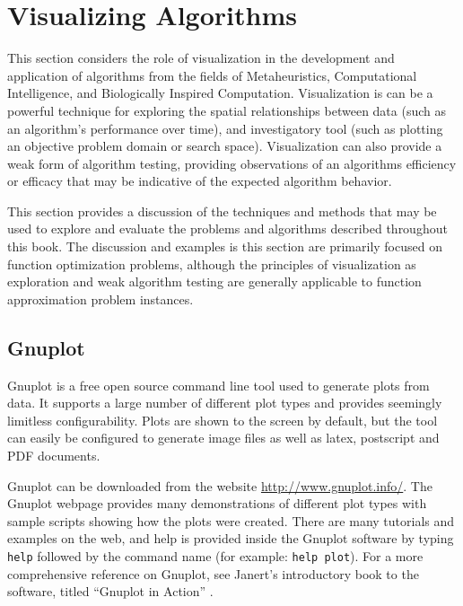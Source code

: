 
\section{Visualizing Algorithms} 
\label{advanced:sec:visualizing_algorithms}

This section considers the role of visualization in the development and application of algorithms from the fields of Metaheuristics, Computational Intelligence, and Biologically Inspired Computation.
Visualization is can be a powerful technique for exploring the spatial relationships between data (such as an algorithm's performance over time), and investigatory tool (such as plotting an objective problem domain or search space). Visualization can also provide a weak form of algorithm testing, providing observations of an algorithms efficiency or efficacy that may be indicative of the expected algorithm behavior.

This section provides a discussion of the techniques and methods that may be used to explore and evaluate the problems and algorithms described throughout this book. 
The discussion and examples is this section are primarily focused on function optimization problems, although the principles of visualization as exploration and weak algorithm testing are generally applicable to function approximation problem instances.

%
%
\subsection{Gnuplot}
Gnuplot is a free open source command line tool used to generate plots from data. It supports a large number of different plot types and provides seemingly limitless configurability. Plots are shown to the screen by default, but the tool can easily be configured to generate image files as well as latex, postscript and PDF documents.

Gnuplot can be downloaded from the website \url{http://www.gnuplot.info/}.
The Gnuplot webpage provides many demonstrations of different plot types with sample scripts showing how the plots were created. There are many tutorials and examples on the web, and help is provided inside the Gnuplot software by typing \texttt{help} followed by the command name (for example: \texttt{help plot}). For a more comprehensive reference on Gnuplot, see Janert's introductory book to the software, titled ``Gnuplot in Action'' \cite{Janert2009}.

